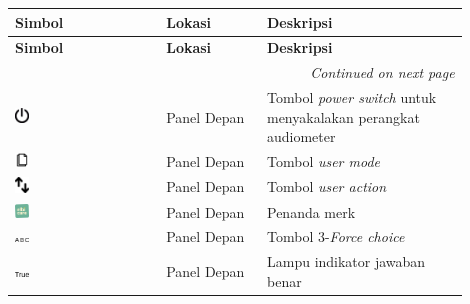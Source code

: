 \documentclass[11pt,a4paper,twoside,onecolumn]{book}
\begin{document}
			\begin{longtable}{| p{0.3\linewidth} | p{0.2\linewidth}| p{0.4\linewidth}|}
				\hline
				\textbf{Simbol} & \textbf{Lokasi} & \textbf{Deskripsi} \\
				\hline
				\endfirsthead
				\hline
				\textbf{Simbol} & \textbf{Lokasi} & \textbf{Deskripsi} \\
				\hline
				\endhead
				\hline
				\multicolumn{3}{r}{\textit{Continued on next page}} \\
				\endfoot
				\hline
				\endlastfoot

				\hline
				\includegraphics[width=0.1\textwidth]{images/powerswitch} & Panel Depan & Tombol \emph{power switch} untuk menyakalakan perangkat audiometer\\
				\hline
				\includegraphics[width=0.1\textwidth]{images/user-mode} & Panel Depan & Tombol \emph{user mode}\\
				\hline
				\includegraphics[width=0.1\textwidth]{images/user-action} & Panel Depan & Tombol \emph{user action}\\
				\hline
				\includegraphics[width=0.1\textwidth]{images/penanda-merk} & Panel Depan & Penanda merk\\
				\hline
				\includegraphics[width=0.1\textwidth]{images/3-forced-choice} & Panel Depan & Tombol 3-\emph{Force choice}\\
				\hline
				\includegraphics[width=0.1\textwidth]{images/true} & Panel Depan & Lampu indikator jawaban benar\\

\end{longtable}
\end{document}
